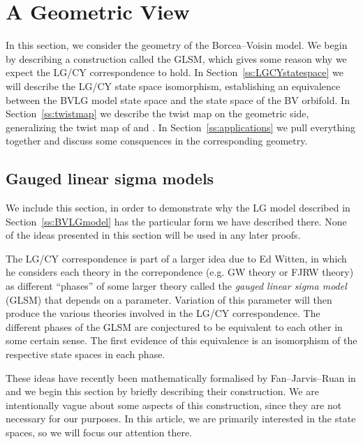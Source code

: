 \documentclass[10pt, letterpaper]{amsart}
\theoremstyle{remark}
\begin{document}


\section{A Geometric View}\label{s:geometry}

In this section, we consider the geometry of the Borcea--Voisin model. We begin by describing a construction called the GLSM, which gives some reason why we expect the LG/CY correspondence to hold. %
In Section~\ref{ss:LGCYstatespace} we will describe the LG/CY state space isomorphism, establishing an equivalence between the BVLG model state space and the state space of the BV orbifold. In Section~\ref{ss:twistmap} we describe the twist map on the geometric side, generalizing the twist map of \cite{Borcea} and \cite{ABS}. In Section~\ref{ss:applications} we pull everything together and discuss some consquences in the corresponding geometry. 



\subsection{Gauged linear sigma models}\label{ss:GLSM}
We include this section, in order to demonstrate why the LG model described in Section~\ref{ss:BVLGmodel} has the particular form we have described there. None of the ideas presented in this section will be used in any later proofs. 

The LG/CY correspondence is part of a larger idea due to Ed Witten, in which he considers each theory in the correpondence (e.g. GW theory or FJRW theory) as different ``phases'' of some larger theory called the \emph{gauged linear sigma model} (GLSM) that depends on a parameter. Variation of this parameter will then produce the various theories involved in the LG/CY correspondence. The different phases of the GLSM are conjectured to be equivalent to each other in some certain sense. The first evidence of this equivalence is an isomorphism of the respective state spaces in each phase. 

These ideas have recently been mathematically formalised by Fan--Jarvis--Ruan in \cite{FJR15} and we begin this section by briefly describing their construction. We are intentionally vague about some aspects of this construction, since they are not necessary for our purposes. In this article, we are primarily interested in the state spaces, so we will focus our attention there. 
\end{document}
